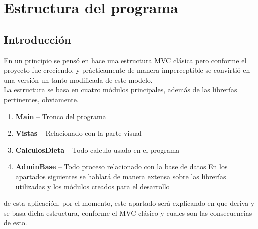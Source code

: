 \section{Estructura del programa}
\subsection{Introducción}
En un principio se pensó en hace una estructura MVC clásica pero conforme el proyecto fue creciendo, y prácticamente de manera imperceptible se convirtió en una versión un tanto modificada de este modelo.\\
La estructura se basa en cuatro módulos principales, además de las librerías pertinentes, obviamente. 
\begin{enumerate}
\item	\textbf{Main} – Tronco del programa
\item	\textbf{Vistas} – Relacionado con la parte visual
\item	\textbf{CalculosDieta} – Todo calculo usado en el programa
\item	\textbf{AdminBase} – Todo proceso relacionado con la base de datos
En los apartados siguientes se hablará de manera extensa sobre las librerías utilizadas y los módulos creados para el desarrollo

\end{enumerate}
 de esta aplicación, por el momento, este apartado será explicando en que deriva y se basa dicha estructura, conforme el MVC clásico y cuales son las consecuencias de esto.
